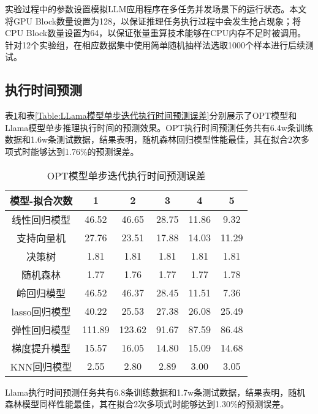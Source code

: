 实验过程中的参数设置模拟LLM应用程序在多任务并发场景下的运行状态。本文将GPU Block数量设置为128，以保证推理任务执行过程中会发生抢占现象；将CPU Block数量设置为64，以保证张量重算技术能够在CPU内存不足时被调用。针对12个实验组，在相应数据集中使用简单随机抽样法选取1000个样本进行后续测试。

\subsection{执行时间预测}

表\ref{Table:OPT模型单步迭代执行时间预测误差}和表\ref{Table:LLama模型单步迭代执行时间预测误差}分别展示了OPT模型和Llama模型单步推理执行时间的预测效果。OPT执行时间预测任务共有6.4w条训练数据和1.6w条测试数据，结果表明，随机森林回归模型性能最佳，其在拟合2次多项式时能够达到1.76\%的预测误差。

\begin{table}[H]
  \centering
  \caption{OPT模型单步迭代执行时间预测误差}
  \label{Table:OPT模型单步迭代执行时间预测误差}
  \renewcommand{\arraystretch}{1.25}
  \small
  \begin{tabular}{c c c c c c}
    \toprule
    \textbf{模型-拟合次数} & \textbf{1} & \textbf{2} & \textbf{3} & \textbf{4} & \textbf{5} \\
    \midrule
    线性回归模型 & 46.52 & 46.65 & 28.75 & 11.86 & 9.32 \\ 
    支持向量机 & 27.76 & 23.51 & 17.88 & 14.03 & 11.29 \\
    决策树 & 1.81 & 1.81 & 1.81 & 1.81 & 1.81 \\ 
    随机森林 & 1.77 & 1.76 & 1.77 & 1.77 & 1.78 \\ 
    岭回归模型 & 46.52 & 46.37 & 28.45 & 11.51 & 7.36 \\ 
    lasso回归模型 & 40.22 & 25.53 & 27.38 & 26.08 & 25.49 \\ 
    弹性回归模型 & 111.89 & 123.62 & 91.67 & 87.59 & 86.48 \\ 
    梯度提升模型 & 15.57 & 16.05 & 14.80 & 15.09 & 14.68 \\ 
    KNN回归模型 & 2.55 & 2.80 & 2.89 & 3.00 & 3.05 \\ 
    \bottomrule
  \end{tabular}
\end{table}

Llama执行时间预测任务共有6.8条训练数据和1.7w条测试数据，结果表明，随机森林模型同样性能最佳，其在拟合2次多项式时能够达到1.30\%的预测误差。

